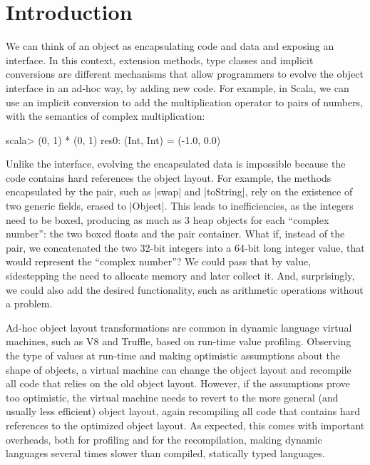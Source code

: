 \section{Introduction}
\label{sec:intro}

We can think of an object as encapsulating code and data and exposing an interface. In this context, extension methods, type classes and implicit conversions are different mechanisms that allow programmers to evolve the object interface in an ad-hoc way, by adding new code. For example, in Scala, we can use an implicit conversion to add the multiplication operator to pairs of numbers, with the semantics of complex multiplication:

\begin{lstlisting-nobreak}
scala> (0, 1) * (0, 1)
res0: (Int, Int) = (-1.0, 0.0)
\end{lstlisting-nobreak}

Unlike the interface, evolving the encapsulated data is impossible because the code contains hard references the object layout. For example, the methods encapsulated by the pair, such as |swap| and |toString|, rely on the existence of two generic fields, erased to |Object|. This leads to inefficiencies, as the integers need to be boxed, producing as much as 3 heap objects for each ``complex number'': the two boxed floats and the pair container. What if, instead of the pair, we concatenated the two 32-bit integers into a 64-bit long integer value, that would represent the ``complex number''? We could pass that by value, sidestepping the need to allocate memory and later collect it. And, surprisingly, we could also add the desired functionality, such as arithmetic operations without a problem.

Ad-hoc object layout transformations are common in dynamic language virtual machines, such as V8 and Truffle, based on run-time value profiling. Observing the type of values at run-time and making optimistic assumptions about the shape of objects, a virtual machine can change the object layout and recompile all code that relies on the old object layout. However, if the assumptions prove too optimistic, the virtual machine needs to revert to the more general (and usually less efficient) object layout, again recompiling all code that contains hard references to the optimized object layout. As expected, this comes with important overheads, both for profiling and for the recompilation, making dynamic languages several times slower than compiled, statically typed languages.

